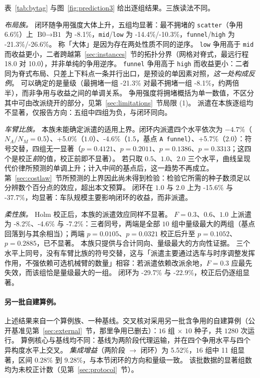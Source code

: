 \documentclass[manuscript,screen,review]{acmart}
\newcommand{\NCases}{10}
\newcommand{\GainProbeStarve}{4.7\%}     %
\newcommand{\GainProbeFleetBase}{-4.6\%} %
\newcommand{\GainProbeFleetOne}{+5.0\%}  %
\newcommand{\GainProbeFleetTwo}{+5.7\%}  %
\newcommand{\GainLoopFunnel}{-21.3\%}    %
\newcommand{\GainLoopHigh}{-26.6\%}      %
\newcommand{\GainLoopMid}{-14.4\%}       %
\newcommand{\GainLoopLow}{-10.3\%}       %
\newcommand{\GainLoopScatter}{-8.1\%}    %
\newcommand{\GainLoopFleetOne}{-15.6\%}  %
\newcommand{\GainLoopFleetTwo}{-37.7\%}  %
\newcommand{\GainLoopFlexLo}{-29.7\%}    %
\newcommand{\GainLoopFlexHi}{-22.9\%}    %
\newcommand{\GainProbeFlexLo}{-8.2\%}    %
\newcommand{\GainProbeFlexHi}{-7.2\%}    %
\newcommand{\PProbeFleetHalfRaw}{=0.4121}
\newcommand{\PProbeFleetOneRaw}{=0.2011}
\newcommand{\PProbeFleetBaseRaw}{=0.1386}
\newcommand{\PProbeFleetTwoRaw}{=0.3313}
\newcommand{\PProbeFlexLoRaw}{=0.0105}
\newcommand{\PProbeFlexLoHolm}{=0.1052}
\newcommand{\PProbeFlexHiRaw}{=0.0321}
\newcommand{\PProbeFlexHiHolm}{=0.2885}
\newcommand{\ContentionLo}{6.6\%}
\newcommand{\LegDumbbell}{10.0}          %
\newcommand{\LegGrid}{18.0}              %
\newcommand{\MatrixCells}{16}
\newcommand{\MatrixRuns}{1280}
\newcommand{\GainIntegMatrix}{5.52\%}    %
\newcommand{\SigIntegMatrix}{11}         %
\newcommand{\GainIntegMatrixLo}{0.28\%}
\newcommand{\GainIntegMatrixHi}{9.28\%}
\begin{document}
表~\ref{tab:bytag} 与图~\ref{fig:prediction3} 给出逐组结果。三族读法不同。

\emph{布局族。}
闭环随争用强度大体上升，五组均显著：最不拥堵的 \texttt{scatter}（争用 \ContentionLo{}）上 $\text{B0}\to\text{B1}$ 为 \GainLoopScatter{}，\texttt{mid}/\texttt{low} 为 \GainLoopMid{}/\GainLoopLow{}，\texttt{funnel}/\texttt{high} 为 \GainLoopFunnel{}/\GainLoopHigh{}。
称「大体」是因为存在两处性质不同的逆序。
\texttt{low} 争用高于 \texttt{mid} 而收益更小，二者跨越第~\ref{sec:instances}~节的拓扑分界（网格对脊式，最远行程 \LegGrid{} 对 \LegDumbbell{}），并非单纯的争用逆序。
\texttt{funnel} 争用高于 \texttt{high} 而收益更小：二者同为脊式布局、只差上下料点一条并行出口，是预设的单因素对照，\emph{这一处构成反例}。
可以确定的是量级（最拥堵一组 \GainLoopFunnel{} 对最不拥堵一组 \GainLoopScatter{}，约两倍半），而非争用与收益之间的单调关系。
争用强度将拥堵概括为单一数值，不区分其中可由改派绕开的部分，见第~\ref{sec:limitations}~节局限 (1)。
派遣在本族逐组均不显著，仅报告方向：五组中四组为负，与闭环同向。

\emph{车臂比族。}
本族未能确定派遣的适用上界。闭环内派遣四个水平依次为 $-\GainProbeStarve$（$N_A/N_M=0.5$）、\GainProbeFleetOne{}（$1.0$）、\GainProbeFleetBase{}（$1.5$，基点 \texttt{A funnel}）、\GainProbeFleetTwo{}（$2.0$）：符号交替，四组无一显著（$p\PProbeFleetHalfRaw$、$p\PProbeFleetOneRaw$、$p\PProbeFleetBaseRaw$、$p\PProbeFleetTwoRaw$；这四个是校正\emph{前}的值，校正前即不显著）。
若只取 $0.5$、$1.0$、$2.0$ 三个水平，曲线呈现代价律所预测的单调上升；计入中间的基点后，这一趋势不再成立。
第~\ref{sec:costlaw}~节所预测的上界因此尚未得到检验：检验它所需的种子数须足以分辨数个百分点的效应，超出本文预算。
闭环在 $1.0$ 与 $2.0$ 上为 \GainLoopFleetOne{} 与 \GainLoopFleetTwo{}，均显著：车队规模主要影响闭环的收益，而非派遣。

\emph{柔性族。}
Holm 校正后，本族的派遣效应同样不显著。
$F=0.3$、$0.6$、$1.0$ 上派遣为 \GainProbeFlexLo{}、\GainProbeFleetBase{} 与 \GainProbeFlexHi{}：三者同号，两端是全部 $\NCases$ 组中量级最大的两组（基点回落到与其余相当）；两端 $p\PProbeFlexLoRaw$、$p\PProbeFlexHiRaw$ 校正后升至 $p\PProbeFlexLoHolm$、$p\PProbeFlexHiHolm$，已不显著。
本族只提供与合计同向、量级最大的方向性证据。
三个水平上同号，没有车臂比族的符号交替，这与「派遣主要通过选车与时序调整发挥作用，不强依赖可选机械臂的数量」相容：若派遣依赖改派余地，$F=0.3$ 应最先失效，而该组恰是量级最大的一组。
闭环为 \GainLoopFlexLo{} 与 \GainLoopFlexHi{}，校正后仍逐组显著。

\paragraph{另一批自建算例。}
上述结果来自一个算例族、一种基线。交叉核对采用另一批含争用的自建算例（公开基准见第~\ref{sec:external}~节，那里争用已删去）：$\MatrixCells$ 组 $\times$ $10$ 种子，共 $\MatrixRuns$ 次运行。
算例核心与基线均不同：基线为两阶段代理运输，并在四个争用水平与四个异构度水平上交叉。
\emph{集成增益}（两阶段 $\to$ 闭环）为 \GainIntegMatrix{}，$\MatrixCells$ 组中 \SigIntegMatrix{} 组显著，区间 \GainIntegMatrixLo{} 到 \GainIntegMatrixHi{}，与本节闭环的方向和量级一致。
该批数据的显著组数均为未校正计数（见第~\ref{sec:protocol}~节）。
\end{document}
